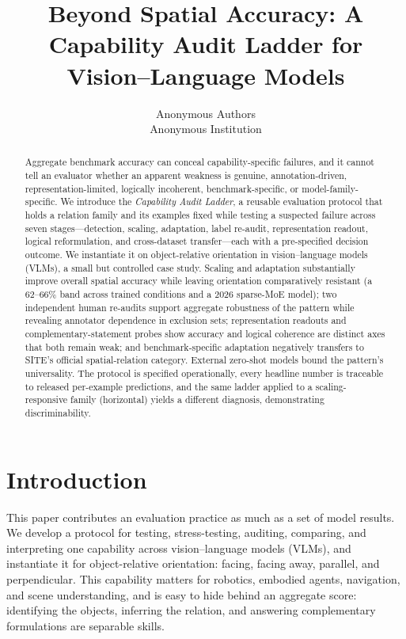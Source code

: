 \documentclass[10pt,twocolumn,letterpaper]{article}
\title{Beyond Spatial Accuracy: A Capability Audit Ladder for Vision--Language Models}
\author{Anonymous Authors\\
Anonymous Institution}
\begin{document}
\maketitle

\begin{abstract}
Aggregate benchmark accuracy can conceal capability-specific failures, and it cannot tell an evaluator whether an apparent weakness is genuine, annotation-driven, representation-limited, logically incoherent, benchmark-specific, or model-family-specific. We introduce the \emph{Capability Audit Ladder}, a reusable evaluation protocol that holds a relation family and its examples fixed while testing a suspected failure across seven stages---detection, scaling, adaptation, label re-audit, representation readout, logical reformulation, and cross-dataset transfer---each with a pre-specified decision outcome. We instantiate it on object-relative orientation in vision--language models (VLMs), a small but controlled case study.
Scaling and adaptation substantially improve overall spatial accuracy while leaving orientation comparatively resistant (a 62--66\% band across trained conditions and a 2026 sparse-MoE model); two independent human re-audits support aggregate robustness of the pattern while revealing annotator dependence in exclusion sets; representation readouts and complementary-statement probes show accuracy and logical coherence are distinct axes that both remain weak; and benchmark-specific adaptation negatively transfers to SITE's official spatial-relation category. External zero-shot models bound the pattern's universality. The protocol is specified operationally, every headline number is traceable to released per-example predictions, and the same ladder applied to a scaling-responsive family (horizontal) yields a different diagnosis, demonstrating discriminability.
\end{abstract}

\section{Introduction}
This paper contributes an evaluation practice as much as a set of model results. We develop a protocol for testing, stress-testing, auditing, comparing, and interpreting one capability across vision--language models (VLMs), and instantiate it for object-relative orientation: facing, facing away, parallel, and perpendicular. This capability matters for robotics, embodied agents, navigation, and scene understanding, and is easy to hide behind an aggregate score: identifying the objects, inferring the relation, and answering complementary formulations are separable skills.
\end{document}
